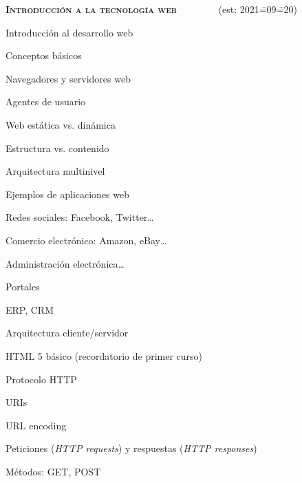 \begin{longenum}
    \item \textbf{\textsc{Introducción a la tecnología web}} \ \ \ \ \ \ \ \ (est: 2021\==09\==20)
    \begin{longenum}
        \item Introducción al desarrollo web
        \begin{longenum}
            \item Conceptos básicos
            \begin{longenum}
                \item Navegadores y servidores web
                \item Agentes de usuario
                \item Web estática vs. dinámica
                \item Estructura vs. contenido
                \item Arquitectura multinivel
            \end{longenum}
            \item Ejemplos de aplicaciones web
            \begin{longenum}
                \item Redes sociales: Facebook, Twitter…
                \item Comercio electrónico: Amazon, eBay…
                \item Administración electrónica…
                \item Portales
                \item ERP, CRM
            \end{longenum}
        \end{longenum}
        \item Arquitectura cliente/servidor
        \item HTML 5 básico (recordatorio de primer curso)
        \item Protocolo HTTP
        \begin{longenum}
            \item URIs
            \begin{longenum}
                \item URL encoding
            \end{longenum}
            \item Peticiones (\textit{HTTP requests}) y respuestas (\textit{HTTP responses})
            \item Métodos: GET, POST

\end{longenum}
\end{longenum}
\end{longenum}
